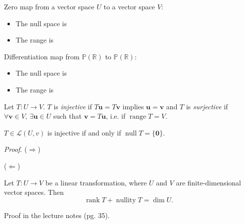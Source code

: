 \documentclass [aspectratio=169]{beamer}
\newcommand{\bu}{{\mathbf{u}}}
\newcommand{\bv}{{\mathbf{v}}}
\newcommand{\zerovec}{{\mathbf{0}}}
\newcommand{\R}{{\mathbb{R}}}
\newcommand{\cL}{{\mathcal{L}}}
\DeclareMathOperator{\range}{range}
\DeclareMathOperator{\rank}{rank}
\DeclareMathOperator{\nullspace}{null}
\DeclareMathOperator{\nullity}{nullity}
\begin{document}
\begin{frame}

\begin{example}
Zero map from a vector space $U$ to a vector space $V$:
\begin{itemize}
\setlength\itemsep{1em}
    \item The null space is 
    \item The range is 
\end{itemize}
\vspace{2em}

Differentiation map from $\mathbb{P}(\R)$ to $\mathbb{P}(\R)$:
\begin{itemize}
\setlength\itemsep{1em}
    \item The null space is 
    \item The range is 
\end{itemize}
\vspace{2em}
\end{example}

\end{frame}




\begin{frame}
\begin{definition}
Let $T:U \to V$. $T$ is \emph{injective} if $T\bu = T\bv$ implies $\bu = \bv$ and $T$ is \emph{surjective} if $\forall \bv \in V, \, \exists \bu \in U$ such that $\bv = T\bu$, i.e. if $\range T = V$.
\end{definition}

\vspace{3em}

\begin{theorem}
$T \in \cL(U,v)$ is injective if and only if $\nullspace T = \{ \zerovec \}$.
\end{theorem}
\end{frame}

\begin{frame}
\textit{Proof}.
($\Rightarrow$) 

\vspace{3.5cm}

($\Leftarrow$) 


\vspace{3cm}


\end{frame}




\begin{frame}
\begin{theorem}
Let $T:U \to V$ be a linear transformation, where $U$ and $V$ are finite-dimensional vector spaces. Then  
\begin{equation*}
\rank T + \nullity  T = \dim U.
\end{equation*}
\end{theorem}
\vspace{3em}

Proof in the lecture notes (pg. 35).
\vspace{3em}

\end{frame}
\end{document}
